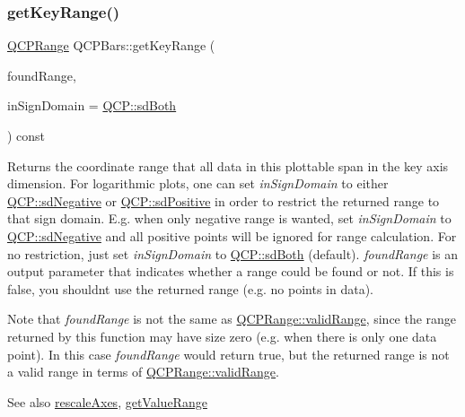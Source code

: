 \subsubsection{\texorpdfstring{get\+Key\+Range()}{getKeyRange()}}
{\footnotesize\ttfamily \hyperlink{classQCPRange}{Q\+C\+P\+Range} Q\+C\+P\+Bars\+::get\+Key\+Range (\begin{DoxyParamCaption}\item[{bool \&}]{found\+Range,  }\item[{\hyperlink{namespaceQCP_afd50e7cf431af385614987d8553ff8a9}{Q\+C\+P\+::\+Sign\+Domain}}]{in\+Sign\+Domain = {\ttfamily \hyperlink{namespaceQCP_afd50e7cf431af385614987d8553ff8a9aa38352ef02d51ddfa4399d9551566e24}{Q\+C\+P\+::sd\+Both}} }\end{DoxyParamCaption}) const\hspace{0.3cm}{\ttfamily [virtual]}}

Returns the coordinate range that all data in this plottable span in the key axis dimension. For logarithmic plots, one can set {\itshape in\+Sign\+Domain} to either \hyperlink{namespaceQCP_afd50e7cf431af385614987d8553ff8a9a2d18af0bc58f6528d1e82ce699fe4829}{Q\+C\+P\+::sd\+Negative} or \hyperlink{namespaceQCP_afd50e7cf431af385614987d8553ff8a9a584784b75fb816abcc627cf743bb699f}{Q\+C\+P\+::sd\+Positive} in order to restrict the returned range to that sign domain. E.\+g. when only negative range is wanted, set {\itshape in\+Sign\+Domain} to \hyperlink{namespaceQCP_afd50e7cf431af385614987d8553ff8a9a2d18af0bc58f6528d1e82ce699fe4829}{Q\+C\+P\+::sd\+Negative} and all positive points will be ignored for range calculation. For no restriction, just set {\itshape in\+Sign\+Domain} to \hyperlink{namespaceQCP_afd50e7cf431af385614987d8553ff8a9aa38352ef02d51ddfa4399d9551566e24}{Q\+C\+P\+::sd\+Both} (default). {\itshape found\+Range} is an output parameter that indicates whether a range could be found or not. If this is false, you shouldn\textquotesingle{}t use the returned range (e.\+g. no points in data).

Note that {\itshape found\+Range} is not the same as \hyperlink{classQCPRange_ab38bd4841c77c7bb86c9eea0f142dcc0}{Q\+C\+P\+Range\+::valid\+Range}, since the range returned by this function may have size zero (e.\+g. when there is only one data point). In this case {\itshape found\+Range} would return true, but the returned range is not a valid range in terms of \hyperlink{classQCPRange_ab38bd4841c77c7bb86c9eea0f142dcc0}{Q\+C\+P\+Range\+::valid\+Range}.

\begin{DoxySeeAlso}{See also}
\hyperlink{classQCPAbstractPlottable_a1491c4a606bccd2d09e65e11b79eb882}{rescale\+Axes}, \hyperlink{classQCPBars_a02cee4bf94d48a1e5f6fc185d9a10477}{get\+Value\+Range} 
\end{DoxySeeAlso}


